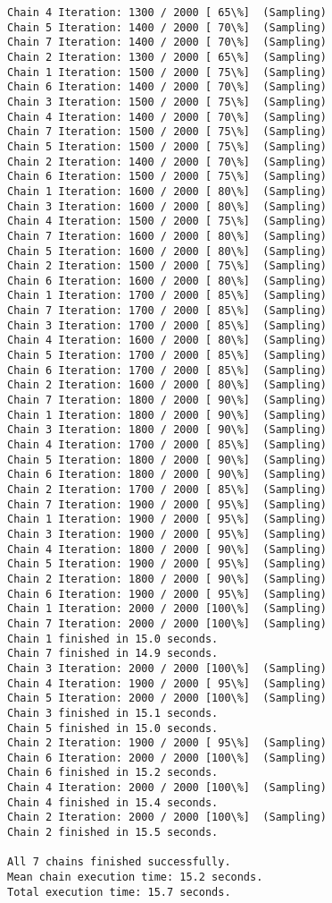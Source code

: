 \documentclass[11pt]{article}
\begin{document}
\begin{Verbatim}[commandchars=\\\{\}]
Chain 4 Iteration: 1300 / 2000 [ 65\%]  (Sampling)
Chain 5 Iteration: 1400 / 2000 [ 70\%]  (Sampling)
Chain 7 Iteration: 1400 / 2000 [ 70\%]  (Sampling)
Chain 2 Iteration: 1300 / 2000 [ 65\%]  (Sampling)
Chain 1 Iteration: 1500 / 2000 [ 75\%]  (Sampling)
Chain 6 Iteration: 1400 / 2000 [ 70\%]  (Sampling)
Chain 3 Iteration: 1500 / 2000 [ 75\%]  (Sampling)
Chain 4 Iteration: 1400 / 2000 [ 70\%]  (Sampling)
Chain 7 Iteration: 1500 / 2000 [ 75\%]  (Sampling)
Chain 5 Iteration: 1500 / 2000 [ 75\%]  (Sampling)
Chain 2 Iteration: 1400 / 2000 [ 70\%]  (Sampling)
Chain 6 Iteration: 1500 / 2000 [ 75\%]  (Sampling)
Chain 1 Iteration: 1600 / 2000 [ 80\%]  (Sampling)
Chain 3 Iteration: 1600 / 2000 [ 80\%]  (Sampling)
Chain 4 Iteration: 1500 / 2000 [ 75\%]  (Sampling)
Chain 7 Iteration: 1600 / 2000 [ 80\%]  (Sampling)
Chain 5 Iteration: 1600 / 2000 [ 80\%]  (Sampling)
Chain 2 Iteration: 1500 / 2000 [ 75\%]  (Sampling)
Chain 6 Iteration: 1600 / 2000 [ 80\%]  (Sampling)
Chain 1 Iteration: 1700 / 2000 [ 85\%]  (Sampling)
Chain 7 Iteration: 1700 / 2000 [ 85\%]  (Sampling)
Chain 3 Iteration: 1700 / 2000 [ 85\%]  (Sampling)
Chain 4 Iteration: 1600 / 2000 [ 80\%]  (Sampling)
Chain 5 Iteration: 1700 / 2000 [ 85\%]  (Sampling)
Chain 6 Iteration: 1700 / 2000 [ 85\%]  (Sampling)
Chain 2 Iteration: 1600 / 2000 [ 80\%]  (Sampling)
Chain 7 Iteration: 1800 / 2000 [ 90\%]  (Sampling)
Chain 1 Iteration: 1800 / 2000 [ 90\%]  (Sampling)
Chain 3 Iteration: 1800 / 2000 [ 90\%]  (Sampling)
Chain 4 Iteration: 1700 / 2000 [ 85\%]  (Sampling)
Chain 5 Iteration: 1800 / 2000 [ 90\%]  (Sampling)
Chain 6 Iteration: 1800 / 2000 [ 90\%]  (Sampling)
Chain 2 Iteration: 1700 / 2000 [ 85\%]  (Sampling)
Chain 7 Iteration: 1900 / 2000 [ 95\%]  (Sampling)
Chain 1 Iteration: 1900 / 2000 [ 95\%]  (Sampling)
Chain 3 Iteration: 1900 / 2000 [ 95\%]  (Sampling)
Chain 4 Iteration: 1800 / 2000 [ 90\%]  (Sampling)
Chain 5 Iteration: 1900 / 2000 [ 95\%]  (Sampling)
Chain 2 Iteration: 1800 / 2000 [ 90\%]  (Sampling)
Chain 6 Iteration: 1900 / 2000 [ 95\%]  (Sampling)
Chain 1 Iteration: 2000 / 2000 [100\%]  (Sampling)
Chain 7 Iteration: 2000 / 2000 [100\%]  (Sampling)
Chain 1 finished in 15.0 seconds.
Chain 7 finished in 14.9 seconds.
Chain 3 Iteration: 2000 / 2000 [100\%]  (Sampling)
Chain 4 Iteration: 1900 / 2000 [ 95\%]  (Sampling)
Chain 5 Iteration: 2000 / 2000 [100\%]  (Sampling)
Chain 3 finished in 15.1 seconds.
Chain 5 finished in 15.0 seconds.
Chain 2 Iteration: 1900 / 2000 [ 95\%]  (Sampling)
Chain 6 Iteration: 2000 / 2000 [100\%]  (Sampling)
Chain 6 finished in 15.2 seconds.
Chain 4 Iteration: 2000 / 2000 [100\%]  (Sampling)
Chain 4 finished in 15.4 seconds.
Chain 2 Iteration: 2000 / 2000 [100\%]  (Sampling)
Chain 2 finished in 15.5 seconds.

All 7 chains finished successfully.
Mean chain execution time: 15.2 seconds.
Total execution time: 15.7 seconds.

    \end{Verbatim}
\end{document}
